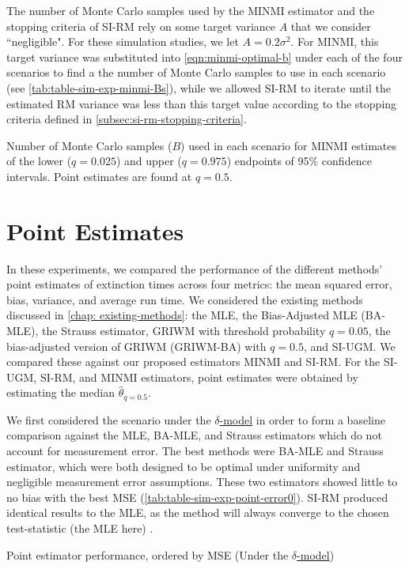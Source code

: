 The number of Monte Carlo samples used by the MINMI estimator and the stopping criteria of SI-RM rely on some target variance $A$ that we consider ``negligible". For these simulation studies, we let $A = 0.2\sigma^2$. For MINMI, this target variance was substituted into \autoref{eqn:minmi-optimal-b} under each of the four scenarios to find a the number of Monte Carlo samples to use in each scenario (see \autoref{tab:table-sim-exp-minmi-Bs}), while we allowed SI-RM to iterate until the estimated RM variance was less than this target value according to the stopping criteria defined in \autoref{subsec:si-rm-stopping-criteria}.
\begin{table}[ht]
    \centering
    \caption{Number of Monte Carlo samples ($B$) used in each scenario for MINMI estimates of the lower ($q=0.025$) and upper ($q=0.975$) endpoints of 95\% confidence intervals. Point estimates are found at $q = 0.5$.}
    \vspace{4mm}
    
    \label{tab:table-sim-exp-minmi-Bs}
    \vspace{-4mm}
\end{table}

\section{Point Estimates}

In these experiments, we compared the performance of the different methods' point estimates of extinction times across four metrics: the mean squared error, bias, variance, and average run time. We considered the existing methods discussed in \autoref{chap: existing-methods}: the MLE, the Bias-Adjusted MLE (BA-MLE), the Strauss estimator, GRIWM with threshold probability $q=0.05$, the bias-adjusted version of GRIWM (GRIWM-BA) with $q=0.5$, and SI-UGM. We compared these against our proposed estimators MINMI and SI-RM. For the SI-UGM, SI-RM, and MINMI estimators, point estimates were obtained by estimating the median $\hat\theta_{q=0.5}$.

We first considered the scenario under the \hyperref[model: no-measurement-error]{$\delta$-model} in order to form a baseline comparison against the MLE, BA-MLE, and Strauss estimators which do not account for measurement error. The best methods were BA-MLE and Strauss estimator, which were both designed to be optimal under uniformity and negligible measurement error assumptions. These two estimators showed little to no bias with the best MSE (\autoref{tab:table-sim-exp-point-error0}). SI-RM produced identical results to the MLE, as the method will always converge to the chosen test-statistic (the MLE here) \cite{Garthwaite1992}.
\begin{table}[ht]
    \centering
    \caption{Point estimator performance, ordered by MSE (Under the \hyperref[model: no-measurement-error]{$\delta$-model})}
    
    \label{tab:table-sim-exp-point-error0}
\end{table}

